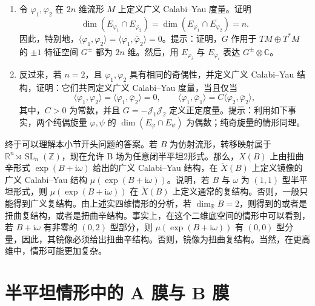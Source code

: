 \begin{exercise}\label{exer:6.50}
\begin{enumerate}[label=(\arabic*)]
\item 令 $\varphi_1,\varphi_2$ 在 $2n$ 维流形 $M$ 上定义广义 Calabi--Yau 度量。证明
\[
\dim(E_{\varphi_1}\cap E_{\varphi_2})
=\dim(E_{\varphi_1}\cap\overline{E_{\varphi_2}})=n.
\]
因此，特别地，$\langle\varphi_1,\varphi_2\rangle
=\langle\varphi_1,\overline\varphi_2\rangle=0$。提示：证明，$G$ 作用于 $TM\oplus T^*M$ 的 $\pm1$ 特征空间 $G^\pm$ 都为 $2n$ 维。然后，用 $E_{\varphi_i}$ 与 $E_{\overline\varphi_i}$ 表达 $G^\pm\otimes\mathbb C$。
\item 反过来，若 $n=2$，且 $\varphi_1,\varphi_2$ 具有相同的奇偶性，并定义广义 Calabi--Yau 结构，证明：它们共同定义广义 Calabi--Yau 度量，当且仅当
\[
\langle\varphi_1,\varphi_2\rangle
=\langle\varphi_1,\overline\varphi_2\rangle=0,
\qquad
\langle\varphi_1,\overline\varphi_1\rangle
=C\langle\varphi_2,\overline\varphi_2\rangle,
\]
其中，$C>0$ 为常数，并且 $G=-\mathcal J_1\mathcal J_2$ 定义正定度量。提示：利用如下事实，两个纯偶旋量 $\varphi,\psi$ 的 $\dim(E_\varphi\cap E_\psi)$ 为偶数；纯奇旋量的情形同理。
\end{enumerate}
\end{exercise}

\begin{example}\label{ex:6.51}
终于可以理解本小节开头问题的答案。若 $B$ 为仿射流形，转移映射属于 $\mathbb R^n\rtimes\operatorname{SL}_n(\mathbb Z)$，现在允许 B 场为任意闭半平坦2形式。那么，$X(B)$ 上由扭曲辛形式 $\exp(B+\mathrm i\omega)$ 给出的广义 Calabi--Yau 结构，在 $\check X(B)$ 上定义镜像的广义 Calabi--Yau 结构 $\mu(\exp(B+\mathrm i\omega))$。说明，若 $B$ 与 $\omega$ 为 $(1,1)$ 型半平坦形式，则 $\mu(\exp(B+\mathrm i\omega))$ 在 $\check X(B)$ 上定义通常的复结构。否则，一般只能得到广义复结构。由上述实四维情形的分析，若 $\dim_{\mathbb R}B=2$，则得到的或者是扭曲复结构，或者是扭曲辛结构。事实上，在这个二维底空间的情形中可以看到，若 $B+\mathrm i\omega$ 有非零的 $(0,2)$ 型部分，则 $\mu(\exp(B+\mathrm i\omega))$ 有 $(0,0)$ 型分量，因此，其镜像必须给出扭曲辛结构。否则，镜像为扭曲复结构。当然，在更高维中，情形可能更加复杂。
\end{example}

\section{半平坦情形中的 A 膜与 B 膜}\label{sec:6.3}

